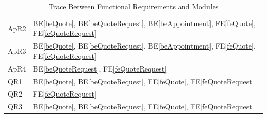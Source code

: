 \documentclass[12pt, titlepage]{article}
\newcommand{\feref}[1]{FE\ref{#1}}
\newcommand{\beref}[1]{BE\ref{#1}}
\begin{document}
\begin{table}[H]
\begin{tabular}{p{} p{}}
ApR2 & \beref{beQuote}, \beref{beQuoteRequest}, \beref{beAppointment}, \feref{feQuote}, \feref{feQuoteRequest} \\
ApR3 & \beref{beQuote}, \beref{beQuoteRequest}, \beref{beAppointment}, \feref{feQuote}, \feref{feQuoteRequest} \\
ApR4 & \beref{beQuoteRequest}, \feref{feQuoteRequest} \\
QR1 & \beref{beQuote}, \beref{beQuoteRequest}, \feref{feQuote}, \feref{feQuoteRequest} \\
QR2 & \feref{feQuoteRequest} \\
QR3 & \beref{beQuote}, \beref{beQuoteRequest}, \feref{feQuote}, \feref{feQuoteRequest} \\
\bottomrule
\end{tabular}
\caption{Trace Between Functional Requirements and Modules}
\label{TblFRT}
\end{table}
\end{document}
